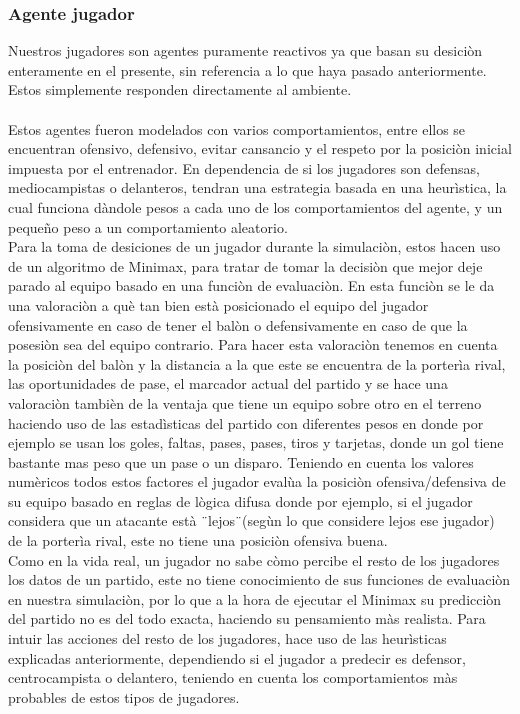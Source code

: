 \documentclass{article}
\begin{document}
    \subsubsection{Agente jugador}
    Nuestros jugadores son agentes puramente reactivos ya que basan su desiciòn enteramente en el presente, sin referencia a lo que haya pasado anteriormente. Estos simplemente responden directamente al ambiente.\\ \\
    Estos agentes fueron modelados con varios comportamientos, entre ellos se encuentran ofensivo, defensivo, evitar cansancio y el respeto por la posiciòn inicial impuesta por el entrenador. En dependencia de si los jugadores son defensas, mediocampistas o delanteros, tendran una estrategia basada en una heurìstica, la cual funciona dàndole pesos a cada uno de los comportamientos del agente, y un pequeño peso a un comportamiento aleatorio.\\

    Para la toma de desiciones de un jugador durante la simulaciòn, estos hacen uso de un algoritmo de Minimax, para tratar de tomar la decisiòn que mejor deje parado al equipo basado en una funciòn de evaluaciòn. En esta funciòn se le da una valoraciòn a què tan bien està posicionado el equipo del jugador ofensivamente en caso de tener el balòn o defensivamente en caso de que la posesiòn sea del equipo contrario. Para hacer esta valoraciòn tenemos en cuenta la posiciòn del balòn y la distancia a la que este se encuentra de la porterìa rival, las oportunidades de pase, el marcador actual del partido y se hace una valoraciòn tambièn de la ventaja que tiene un equipo sobre otro en el terreno haciendo uso de las estadìsticas del partido con diferentes pesos en donde por ejemplo se usan los goles, faltas, pases, pases, tiros y tarjetas, donde un gol tiene bastante mas peso que un pase  o un disparo. Teniendo en cuenta los valores numèricos todos estos factores el jugador evalùa la posiciòn ofensiva/defensiva de su equipo basado en reglas de lògica difusa donde por ejemplo, si el jugador considera que un atacante està ¨lejos¨(segùn lo que considere lejos ese jugador) de la porterìa rival, este no tiene una posiciòn ofensiva buena.\\

    Como en la vida real, un jugador no sabe còmo percibe el resto de los jugadores los datos de un partido, este no tiene conocimiento de sus funciones de evaluaciòn en nuestra simulaciòn, por lo que a la hora de ejecutar el Minimax su predicciòn del partido no es del todo exacta, haciendo su pensamiento màs realista. Para intuir las acciones del resto de los jugadores, hace uso de las heurìsticas explicadas anteriormente, dependiendo si el jugador a predecir es defensor, centrocampista o delantero, teniendo en cuenta los comportamientos màs probables de estos tipos de jugadores.
    
\end{document}
